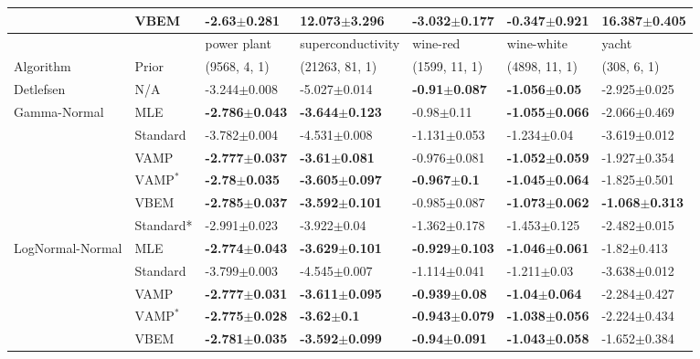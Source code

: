 \begin{tabular}{lllllll}
                 & VBEM &           -2.63$\pm$0.281 &           12.073$\pm$3.296 &  \textbf{-3.032$\pm$0.177} &          -0.347$\pm$0.921 &           16.387$\pm$0.405 \\
\midrule
                 &      &                power plant &          superconductivity &                   wine-red &                 wine-white &                      yacht \\
Algorithm & Prior& (9568, 4, 1)& (21263, 81, 1)& (1599, 11, 1)& (4898, 11, 1)& (308, 6, 1)\\
\midrule
Detlefsen & N/A &           -3.244$\pm$0.008 &           -5.027$\pm$0.014 &   \textbf{-0.91$\pm$0.087} &   \textbf{-1.056$\pm$0.05} &           -2.925$\pm$0.025 \\
Gamma-Normal & MLE &  \textbf{-2.786$\pm$0.043} &  \textbf{-3.644$\pm$0.123} &             -0.98$\pm$0.11 &  \textbf{-1.055$\pm$0.066} &           -2.066$\pm$0.469 \\
                 & Standard &           -3.782$\pm$0.004 &           -4.531$\pm$0.008 &           -1.131$\pm$0.053 &            -1.234$\pm$0.04 &           -3.619$\pm$0.012 \\
                 & VAMP &  \textbf{-2.777$\pm$0.037} &   \textbf{-3.61$\pm$0.081} &           -0.976$\pm$0.081 &  \textbf{-1.052$\pm$0.059} &           -1.927$\pm$0.354 \\
                 & $\text{VAMP}^*$ &   \textbf{-2.78$\pm$0.035} &  \textbf{-3.605$\pm$0.097} &    \textbf{-0.967$\pm$0.1} &  \textbf{-1.045$\pm$0.064} &           -1.825$\pm$0.501 \\
                 & VBEM &  \textbf{-2.785$\pm$0.037} &  \textbf{-3.592$\pm$0.101} &           -0.985$\pm$0.087 &  \textbf{-1.073$\pm$0.062} &  \textbf{-1.068$\pm$0.313} \\
                 & Standard* &           -2.991$\pm$0.023 &            -3.922$\pm$0.04 &           -1.362$\pm$0.178 &           -1.453$\pm$0.125 &           -2.482$\pm$0.015 \\
LogNormal-Normal & MLE &  \textbf{-2.774$\pm$0.043} &  \textbf{-3.629$\pm$0.101} &  \textbf{-0.929$\pm$0.103} &  \textbf{-1.046$\pm$0.061} &            -1.82$\pm$0.413 \\
                 & Standard &           -3.799$\pm$0.003 &           -4.545$\pm$0.007 &           -1.114$\pm$0.041 &            -1.211$\pm$0.03 &           -3.638$\pm$0.012 \\
                 & VAMP &  \textbf{-2.777$\pm$0.031} &  \textbf{-3.611$\pm$0.095} &   \textbf{-0.939$\pm$0.08} &   \textbf{-1.04$\pm$0.064} &           -2.284$\pm$0.427 \\
                 & $\text{VAMP}^*$ &  \textbf{-2.775$\pm$0.028} &     \textbf{-3.62$\pm$0.1} &  \textbf{-0.943$\pm$0.079} &  \textbf{-1.038$\pm$0.056} &           -2.224$\pm$0.434 \\
                 & VBEM &  \textbf{-2.781$\pm$0.035} &  \textbf{-3.592$\pm$0.099} &   \textbf{-0.94$\pm$0.091} &  \textbf{-1.043$\pm$0.058} &           -1.652$\pm$0.384 \\
\bottomrule
\end{tabular}

